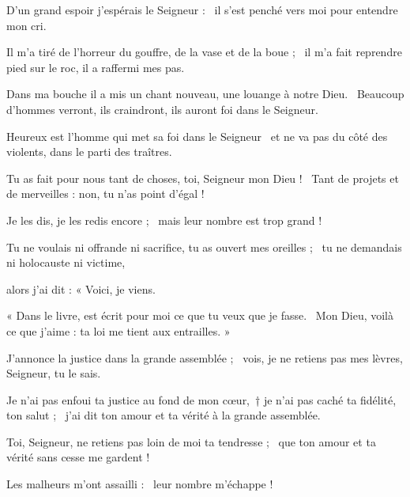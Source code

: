 \item D'un grand espoir j'espérais le Seigneur :~\psstar{} il s'est penché vers moi pour entendre mon cri.

\item Il m'a tiré de l'horreur du gouffre, de la vase et de la boue ;~\psstar{} il m'a fait reprendre pied sur le roc, il a raffermi mes pas.

\item Dans ma bouche il a mis un chant nouveau, une louange à notre Dieu.~\psstar{} Beaucoup d'hommes verront, ils craindront, ils auront foi dans le Seigneur.

\item Heureux est l'homme qui met sa foi dans le Seigneur~\psstar{} et ne va pas du côté des violents, dans le parti des traîtres.

\item Tu as fait pour nous tant de choses, toi, Seigneur mon Dieu !~\psstar{} Tant de projets et de merveilles : non, tu n'as point d'égal ! 

\item Je les dis, je les redis encore ;~\psstar{} mais leur nombre est trop grand !

\item Tu ne voulais ni offrande ni sacrifice, tu as ouvert mes oreilles ;~\psstar{} tu ne demandais ni holocauste ni victime,

\item alors j'ai dit : « Voici, je viens.

\item « Dans le livre, est écrit pour moi ce que tu veux que je fasse.~\psstar{} Mon Dieu, voilà ce que j'aime : ta loi me tient aux entrailles. »

\item J'annonce la justice dans la grande assemblée ;~\psstar{} vois, je ne retiens pas mes lèvres, Seigneur, tu le sais.

\item Je n'ai pas enfoui ta justice au fond de mon cœur,~† je n'ai pas caché ta fidélité, ton salut ;~\psstar{} j'ai dit ton amour et ta vérité à la grande assemblée.

\item Toi, Seigneur, ne retiens pas loin de moi ta tendresse ;~\psstar{} que ton amour et ta vérité sans cesse me gardent !

\item Les malheurs m'ont assailli :~\psstar{} leur nombre m'échappe ! 

